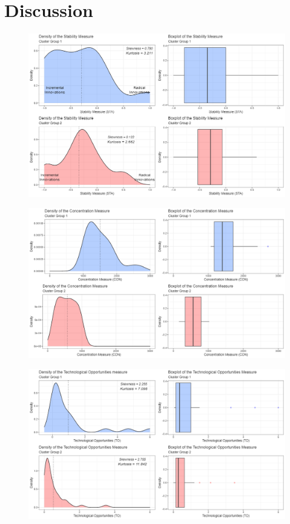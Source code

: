 \documentclass{beamer}
\begin{document}
\section{Discussion}
	\begin{frame}[allowframebreaks]
		\begin{figure}
			\centering
			\includegraphics[scale=0.30]{sta.png}
		\end{figure}
	\framebreak
	\begin{figure}
		\centering
		\includegraphics[scale=0.30]{pcon.png}
	\end{figure}
	\framebreak
	\begin{figure}
		\centering
		\includegraphics[scale=0.30]{to.png}
	\end{figure}
	\end{frame}
\end{document}

